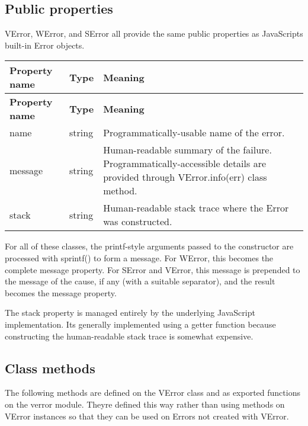 \subsection*{Public properties}

{\ttfamily V\+Error}, {\ttfamily W\+Error}, and {\ttfamily S\+Error} all provide the same public properties as Java\+Script\textquotesingle{}s built-\/in Error objects.

\tabulinesep=1mm
\begin{longtabu} spread 0pt [c]{*{3}{|X[-1]}|}
\hline
\rowcolor{\tableheadbgcolor}\textbf{ Property name  }&\textbf{ Type  }&\textbf{ Meaning   }\\
\endfirsthead
\hline
\endfoot
\hline
\rowcolor{\tableheadbgcolor}\textbf{ Property name  }&\textbf{ Type  }&\textbf{ Meaning   }\\
\endhead
{\ttfamily name}  &string  &Programmatically-\/usable name of the error.   \\
{\ttfamily message}  &string  &Human-\/readable summary of the failure. Programmatically-\/accessible details are provided through {\ttfamily V\+Error.\+info(err)} class method.   \\
{\ttfamily stack}  &string  &Human-\/readable stack trace where the Error was constructed.   \\
\end{longtabu}


For all of these classes, the printf-\/style arguments passed to the constructor are processed with {\ttfamily sprintf()} to form a message. For {\ttfamily W\+Error}, this becomes the complete {\ttfamily message} property. For {\ttfamily S\+Error} and {\ttfamily V\+Error}, this message is prepended to the message of the cause, if any (with a suitable separator), and the result becomes the {\ttfamily message} property.

The {\ttfamily stack} property is managed entirely by the underlying Java\+Script implementation. It\textquotesingle{}s generally implemented using a getter function because constructing the human-\/readable stack trace is somewhat expensive.

\subsection*{Class methods}

The following methods are defined on the {\ttfamily V\+Error} class and as exported functions on the {\ttfamily verror} module. They\textquotesingle{}re defined this way rather than using methods on V\+Error instances so that they can be used on Errors not created with {\ttfamily V\+Error}.

